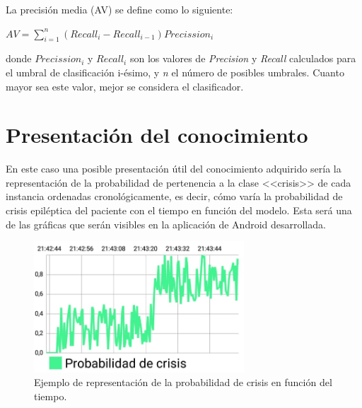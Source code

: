 La precisión media (AV) se define como lo siguiente: 

\begin{center}
	$AV=\sum_{i=1}^{n}(Recall_{i}-Recall_{i-1})Precission_{i}$
\end{center}

donde $Precission_{i}$ y $Recall_{i}$ son los valores de \textit{Precision} y \textit{Recall} calculados para el umbral de clasificación i-ésimo, y \textit{n} el número de posibles umbrales. Cuanto mayor sea este valor, mejor se considera el clasificador. 

\section{Presentación del conocimiento}

En este caso una posible presentación útil del conocimiento adquirido sería la representación de la probabilidad de pertenencia a la clase <<crisis>> de cada instancia ordenadas cronológicamente, es decir, cómo varía la probabilidad de crisis epiléptica del paciente con el tiempo en función del modelo. Esta será una de las gráficas que serán visibles en la aplicación de Android desarrollada. 

\begin{figure}[H]
	\centering
	\includegraphics[width=0.7\textwidth]{../img/prob.png}
	\caption{Ejemplo de representación de la probabilidad de crisis en función del tiempo.}
	\label{fig:prob}
\end{figure} 

